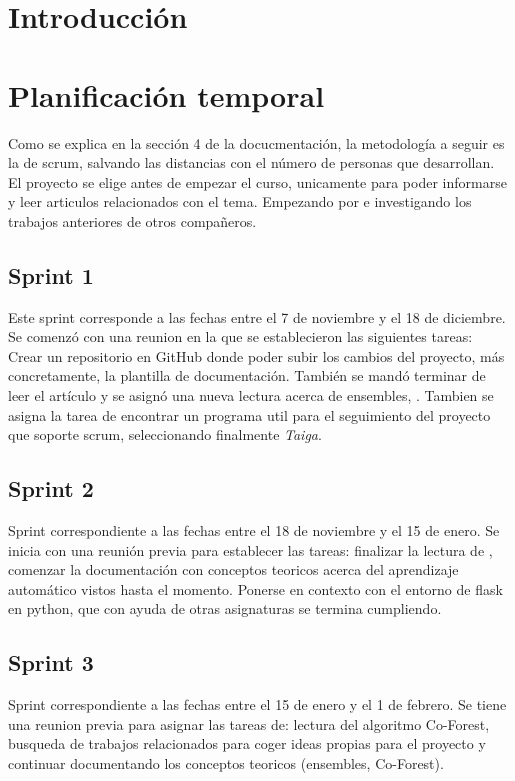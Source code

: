 
\section{Introducción}

\section{Planificación temporal}
Como se explica en la sección 4 de la docucmentación, la metodología a seguir es la de scrum, salvando las distancias con el número de personas que desarrollan.
El proyecto se elige antes de empezar el curso, unicamente para poder informarse y leer articulos relacionados con el tema. Empezando por \cite{Engelen:semi-supervised} e investigando los trabajos anteriores de otros compañeros.
\subsection{Sprint 1}
Este sprint corresponde a las fechas entre el 7 de noviembre y el 18 de diciembre. Se comenzó con una reunion en la que se establecieron las siguientes tareas:\\
Crear un repositorio en GitHub donde poder subir los cambios del proyecto, más concretamente, la plantilla de documentación. También se mandó terminar de leer el artículo \cite{Engelen:semi-supervised} y se asignó una nueva lectura acerca de ensembles, \cite{ensembles}.
Tambien se asigna la tarea de encontrar un programa util para el seguimiento del proyecto que soporte scrum, seleccionando finalmente \textit{Taiga}.
\subsection{Sprint 2}
Sprint correspondiente a las fechas entre el 18 de noviembre y el 15 de enero. Se inicia con una reunión previa para establecer las tareas: 
finalizar la lectura de \cite{ensembles}, comenzar la documentación con conceptos teoricos acerca del aprendizaje automático vistos hasta el momento. Ponerse en contexto con el entorno de flask en python, que con ayuda de otras asignaturas se termina cumpliendo.
\subsection{Sprint 3}
Sprint correspondiente a las fechas entre el 15 de enero y el 1 de febrero. Se tiene una reunion previa para asignar las tareas de: lectura del algoritmo Co-Forest, busqueda de trabajos relacionados para coger ideas propias para el proyecto y continuar documentando los conceptos teoricos (ensembles, Co-Forest).

